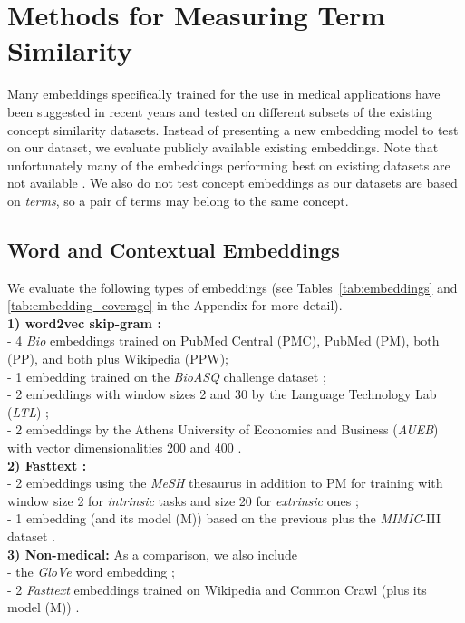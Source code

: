 \documentclass[letterpaper]{article} %
\begin{document}
\section{Methods for Measuring Term Similarity}
Many embeddings specifically trained for the use in medical applications have been suggested in recent years and tested on different subsets of the existing concept similarity datasets. Instead of presenting a new embedding model to test on our dataset, we evaluate publicly available existing embeddings. Note that unfortunately many of the embeddings performing best on existing datasets are not available \cite{LingEtAl2017,HenryCM2018}.
We also do not test concept embeddings as our datasets are based on \emph{terms}, so a pair of terms may belong to the same concept.

\subsection{Word and Contextual Embeddings}

We evaluate the following types of embeddings (see Tables~\ref{tab:embeddings} and \ref{tab:embedding_coverage} in the Appendix for more detail).\\
 \textbf{1)  word2vec skip-gram \cite{MikolovEtAl2013}:} \\
 \indent - 4 \emph{Bio} embeddings \cite{PyysaloEtAl2013} trained on PubMed Central (PMC), PubMed (PM), both (PP), and both plus Wikipedia (PPW);\\
 \indent - 1 embedding trained on the \emph{BioASQ} challenge dataset \cite{KosmopoulosAP2015};\\
 \indent - 2 embeddings with window sizes 2 and 30 by the Language Technology Lab (\emph{LTL}) \cite{ChiuEtAl2016};\\
 \indent - 2 embeddings by the 
 Athens University of Economics and Business (\emph{AUEB}) with vector dimensionalities 200 and 400 \cite{McdonaldEtAl2018}.\\
 \textbf{2) Fasttext \cite{BojanowskiGJM2017}:}\\
 \indent - 2 embeddings using the \emph{MeSH} thesaurus in addition to PM for training with window size 2 for \emph{intrinsic} tasks and size 20 for \emph{extrinsic} ones \cite{ZhangEtAl2019};\\
 \indent - 1 embedding (and its model (M)) based on the previous plus the \emph{MIMIC}-III dataset \cite{ChenPL2019}. \\
 \textbf{3) Non-medical:} As a comparison, we also include \\
 \indent - the \emph{GloVe} word embedding \cite{PenningtonEtAl2014}; \\
 \indent - 2 \emph{Fasttext} embeddings trained on Wikipedia and Common Crawl (plus its model (M)) \cite{MikolovEtAl2018}.
 
\end{document}
